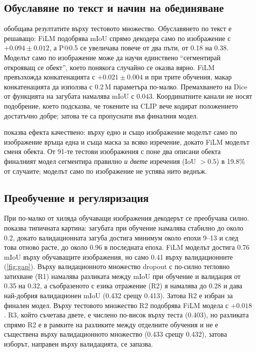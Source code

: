 \documentclass[conference,a4paper]{IEEEtran}
\begin{document}
\subsection{Обуславяне по текст и начин на обединяване}

 обобщава резултатите върху тестовото множество. Обуславянето по текст е решаващо:
FiLM подобрява mIoU спрямо декодера само по изображение с $+0.094 \pm 0.012$, а P@0.5 се увеличава
повече от два пъти, от 0.18 на 0.38. Моделът само по изображение може да научи единствено
\enquote{сегментирай открояващ се обект}, което понякога случайно се оказва вярно. FiLM превъзхожда
конкатенацията с $+0.021 \pm 0.004$ и при трите обучения, макар конкатенацията да използва
с 0.2\,M параметъра по-малко. Премахването на Dice от функцията на загубата намалява mIoU с $0.043$.
Координатните канали не носят подобрение, което подсказва, че токените на CLIP вече кодират
положението достатъчно добре; затова те са пропуснати във финалния модел.

 показва ефекта качествено: върху едно и също изображение моделът само по
изображение връща една и съща маска за всяко изречение, докато FiLM моделът сменя обекта. От 91-те
тестови изображения с поне два описани обекта финалният модел сегментира правилно \emph{и двете}
изречения (IoU $> 0.5$) в 19.8\% от случаите; моделът само по изображение не успява нито веднъж.

\subsection{Преобучение и регуляризация}

При по-малко от хиляда обучаващи изображения декодерът се преобучава силно. 
показва типичната картина: загубата при обучение намалява стабилно до около 0.2, докато
валидационната загуба достига минимум около епохи 9--13 и след това отново расте, до около 0.96 в
последната епоха. FiLM моделът достига 0.76 mIoU върху обучаващите изображения, но само 0.41 върху
валидационните (\cref{fig:gap}). Върху валидационното
множество dropout с по-силно тегловно затихване (R1) намалява разликата между mIoU при обучение и
валидация от 0.35 на 0.32, а съобразеното с езика отражение (R2) я намалява до 0.28 и дава най-добрия
валидационен mIoU (0.432 срещу 0.413). Затова R2 е избран за финален модел. Върху тестовото
множество R2 подобрява FiLM модела с $+0.018$. R3, който съчетава двете, е числено по-висок върху
теста (0.403), но разликата спрямо R2 е в рамките на разликите между отделните обучения и не е
съществена върху валидационното множество (0.433 срещу 0.432), затова изборът, направен върху
валидацията, се запазва.
\end{document}
